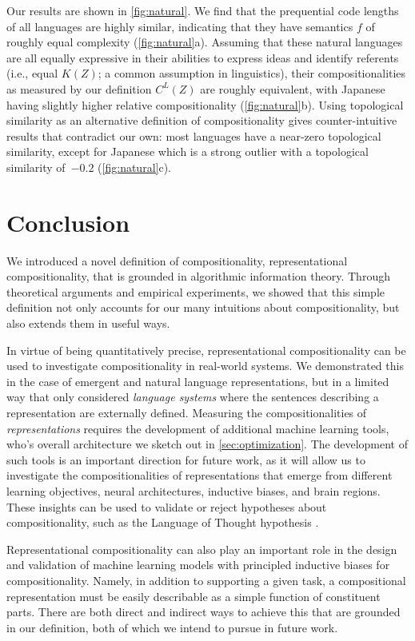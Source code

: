\documentclass{article} %
\newcommand{\comp}{representational compositionality}
\newcommand{\Comp}{Representational compositionality}
\begin{document}
Our results are shown in \cref{fig:natural}. We find that the prequential code lengths of all languages are highly similar, indicating that they have semantics $f$ of roughly equal complexity (\cref{fig:natural}a). Assuming that these natural languages are all equally expressive in their abilities to express ideas and identify referents (i.e., equal $K(Z)$; a common assumption in linguistics), their compositionalities as measured by our definition $C^L(Z)$ are roughly equivalent, with Japanese having slightly higher relative compositionality (\cref{fig:natural}b). Using topological similarity as an alternative definition of compositionality gives counter-intuitive results that contradict our own: most languages have a near-zero topological similarity, except for Japanese which is a strong outlier with a topological similarity of~$-0.2$ (\cref{fig:natural}c).


\section{Conclusion}
\label{sec:discussion}

We introduced a novel definition of compositionality, \comp{}, that is grounded in algorithmic information theory. Through theoretical arguments and empirical experiments, we showed that this simple definition not only accounts for our many intuitions about compositionality, but also extends them in useful ways.

In virtue of being quantitatively precise, \comp{} can be used to investigate compositionality in real-world systems. We demonstrated this in the case of emergent and natural language representations, but in a limited way that only considered \textit{language systems} where the sentences describing a representation are externally defined. Measuring the compositionalities of \textit{representations} requires the development of additional machine learning tools, who's overall architecture we sketch out in \cref{sec:optimization}. The development of such tools is an important direction for future work, as it will allow us to investigate the compositionalities of representations that emerge from different learning objectives, neural architectures, inductive biases, and brain regions. These insights can be used to validate or reject hypotheses about compositionality, such as the Language of Thought hypothesis \citep{fodor1975language}.

\Comp{} can also play an important role in the design and validation of machine learning models with principled inductive biases for compositionality. Namely, in addition to supporting a given task, a compositional representation must be easily describable as a simple function of constituent parts. There are both direct and indirect ways to achieve this that are grounded in our definition, both of which we intend to pursue in future work.
\end{document}
